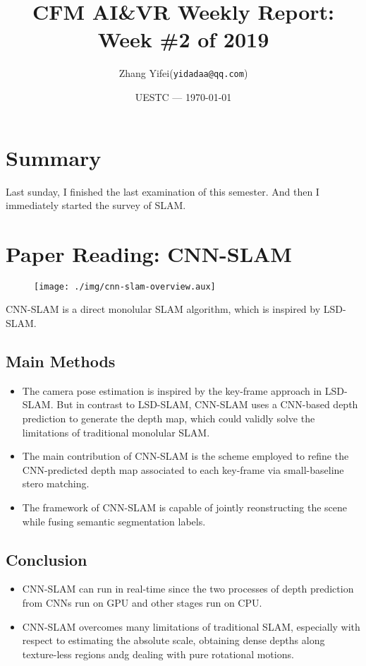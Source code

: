 \documentclass{article}
\title{CFM AI\&VR Weekly Report: Week \#2 of 2019}
\author{Zhang Yifei(\texttt{yidadaa@qq.com})}
\date{UESTC --- \today}
\begin{document}
    
    \maketitle

    \section{Summary}
    Last sunday, I finished the last examination of this semester. And then I immediately started the survey of SLAM. 

    \section{Paper Reading: CNN-SLAM}
    \begin{figure}[h]
        \centering
        \texttt{[image: ./img/cnn-slam-overview.aux]}
    \end{figure}

    CNN-SLAM is a direct monolular SLAM algorithm, which is inspired by LSD-SLAM.
    \subsection{Main Methods}
    \begin{itemize}
        \item The camera pose estimation is inspired by the key-frame approach in LSD-SLAM. But in contrast to LSD-SLAM, CNN-SLAM uses a CNN-based depth prediction to generate the depth map, which could validly solve the limitations of traditional monolular SLAM.
        \item The main contribution of CNN-SLAM is the scheme employed to refine the CNN-predicted depth map associated to each key-frame via small-baseline stero matching.
        \item The framework of CNN-SLAM is capable of jointly reonstructing the scene while fusing semantic segmentation labels.
    \end{itemize}

    \subsection{Conclusion}
    \begin{itemize}
        \item CNN-SLAM can run in real-time since the two processes of depth prediction from CNNs run on GPU and other stages run on CPU.
        \item CNN-SLAM overcomes many limitations of traditional SLAM, especially with respect to estimating the absolute scale, obtaining dense depths along texture-less regions andg dealing with pure rotational motions.
    \end{itemize}
\end{document}
